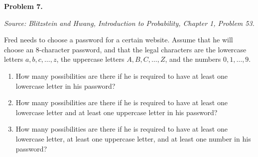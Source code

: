 \documentclass[11pt]{article}
\newcommand{\source}[1]{%
    \vspace{0.15cm}
    {\small\textit{Source: Blitzstein and Hwang, \textit{Introduction to Probability}, Chapter 1, Problem #1.}}
}
\begin{document}

\begin{problemheader}
\textbf{Problem 7. } \hfill 
\end{problemheader}
\source{53}

Fred needs to choose a password for a certain website. Assume that he will choose an 8-character password, and that the legal characters are the lowercase letters $a,b,c,\dots,z$, the uppercase letters $A,B,C,\dots,Z$, and the numbers $0,1,\dots,9$.

\begin{enumerate}[label=(\alph*), leftmargin=*]
    \item How many possibilities are there if he is required to have at least one lowercase letter in his password?

    \item How many possibilities are there if he is required to have at least one lowercase letter and at least one uppercase letter in his password?

    \item How many possibilities are there if he is required to have at least one lowercase letter, at least one uppercase letter, and at least one number in his password?
\end{enumerate}
\end{document}
